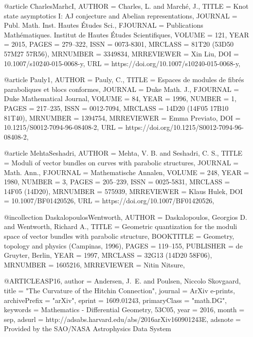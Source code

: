 @article {CharlesMarhcI,
    AUTHOR = {Charles, L. and March\'e, J.},
     TITLE = {Knot state asymptotics {I}: {AJ} conjecture and {A}belian
              representations},
   JOURNAL = {Publ. Math. Inst. Hautes \'Etudes Sci.},
  FJOURNAL = {Publications Math\'ematiques. Institut de Hautes \'Etudes
              Scientifiques},
    VOLUME = {121},
      YEAR = {2015},
     PAGES = {279--322},
      ISSN = {0073-8301},
   MRCLASS = {81T20 (53D50 57M27 57R56)},
  MRNUMBER = {3349834},
MRREVIEWER = {Xin Liu},
       DOI = {10.1007/s10240-015-0068-y},
       URL = {https://doi.org/10.1007/s10240-015-0068-y},
}

@article {Pauly1,
    AUTHOR = {Pauly, C.},
     TITLE = {Espaces de modules de fibr\'es paraboliques et blocs conformes},
   JOURNAL = {Duke Math. J.},
  FJOURNAL = {Duke Mathematical Journal},
    VOLUME = {84},
      YEAR = {1996},
    NUMBER = {1},
     PAGES = {217--235},
      ISSN = {0012-7094},
   MRCLASS = {14D20 (14F05 17B10 81T40)},
  MRNUMBER = {1394754},
MRREVIEWER = {Emma Previato},
       DOI = {10.1215/S0012-7094-96-08408-2},
       URL = {https://doi.org/10.1215/S0012-7094-96-08408-2},
}

@article {MehtaSeshadri,
    AUTHOR = {Mehta, V. B. and Seshadri, C. S.},
     TITLE = {Moduli of vector bundles on curves with parabolic structures},
   JOURNAL = {Math. Ann.},
  FJOURNAL = {Mathematische Annalen},
    VOLUME = {248},
      YEAR = {1980},
    NUMBER = {3},
     PAGES = {205--239},
      ISSN = {0025-5831},
   MRCLASS = {14F05 (14D20)},
  MRNUMBER = {575939},
MRREVIEWER = {Klaus Hulek},
       DOI = {10.1007/BF01420526},
       URL = {https://doi.org/10.1007/BF01420526},
}

@incollection {DaskalopoulosWentworth,
    AUTHOR = {Daskalopoulos, Georgios D. and Wentworth, Richard A.},
     TITLE = {Geometric quantization for the moduli space of vector bundles
              with parabolic structure},
 BOOKTITLE = {Geometry, topology and physics ({C}ampinas, 1996)},
     PAGES = {119--155},
 PUBLISHER = {de Gruyter, Berlin},
      YEAR = {1997},
   MRCLASS = {32G13 (14D20 58F06)},
  MRNUMBER = {1605216},
MRREVIEWER = {Nitin Nitsure},
}

@ARTICLE{ASP16,
   author = {Andersen, J.~E. and Poulsen, Niccolo Skovgaard},
    title = "{The Curvature of the Hitchin Connection}",
  journal = {ArXiv e-prints},
archivePrefix = "arXiv",
   eprint = {1609.01243},
 primaryClass = "math.DG",
 keywords = {Mathematics - Differential Geometry, 53C05},
     year = 2016,
    month = sep,
   adsurl = {http://adsabs.harvard.edu/abs/2016arXiv160901243E},
  adsnote = {Provided by the SAO/NASA Astrophysics Data System}
}

